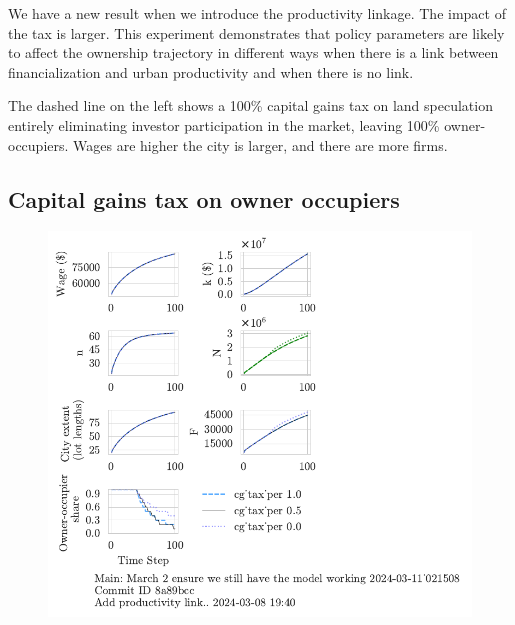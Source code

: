 We have a new result when we introduce the productivity linkage. 
The impact of the tax is larger. This experiment demonstrates that policy parameters are likely to affect the ownership trajectory in different ways when there is a link between financialization and urban productivity and when there is no link.

The dashed line on the left shows a 100\% capital gains tax on land speculation entirely eliminating investor participation in the market, leaving 100\%  owner-occupiers.  Wages are higher the city is larger, and there are more firms. 

\newpage
\subsection{Capital gains tax on owner occupiers}
\begin{figure}[h!tb] 
    \centering
    \includegraphics[scale=.75, trim={0 1.4cm 4.5cm 0},clip]{fig/cg_tax_per-Main-021508.pdf} 

\end{figure}
